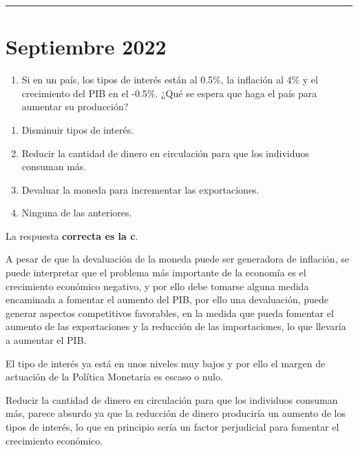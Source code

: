 \documentclass[
  letterpaper,
  DIV=11,
  numbers=noendperiod]{scrreprt}
\providecommand{\tightlist}{%
  \setlength{\itemsep}{0pt}\setlength{\parskip}{0pt}}\usepackage{longtable,booktabs,array}
\begin{document}
\begin{center}\rule{0.5\linewidth}{0.5pt}\end{center}

\hypertarget{septiembre-2022}{%
\chapter*{Septiembre 2022}\label{septiembre-2022}}


\begin{enumerate}
\def\labelenumi{\arabic{enumi}.}
\tightlist
\item
  Si en un país, los tipos de interés están al 0.5\%, la inflación al
  4\% y el crecimiento del PIB en el -0.5\%. ¿Qué se espera que haga el
  país para aumentar su producción?
\end{enumerate}

\begin{enumerate}
\def\labelenumi{\alph{enumi})}
\item
  Disminuir tipos de interés.
\item
  Reducir la cantidad de dinero en circulación para que los individuos
  consuman más.
\item
  Devaluar la moneda para incrementar las exportaciones.
\item
  Ninguna de las anteriores.
\end{enumerate}

\begin{tcolorbox}[enhanced jigsaw, left=2mm, breakable, arc=.35mm, opacityback=0, toprule=.15mm, rightrule=.15mm, leftrule=.75mm, bottomrule=.15mm, colframe=quarto-callout-tip-color-frame, colback=white]
\begin{minipage}[t]{5.5mm}
\textcolor{quarto-callout-tip-color}{\faLightbulb}
\end{minipage}%
\begin{minipage}[t]{\textwidth - 5.5mm}

La respuesta \textbf{correcta es la c}.

A pesar de que la devaluación de la moneda puede ser generadora de
inflación, se puede interpretar que el problema más importante de la
economía es el crecimiento económico negativo, y por ello debe tomarse
alguna medida encaminada a fomentar el aumento del PIB, por ello una
devaluación, puede generar aspectos competitivos favorables, en la
medida que pueda fomentar el aumento de las exportaciones y la reducción
de las importaciones, lo que llevaría a aumentar el PIB.

El tipo de interés ya está en unos niveles muy bajos y por ello el
margen de actuación de la Política Monetaria es escaso o nulo.

Reducir la cantidad de dinero en circulación para que los individuos
consuman más, parece absurdo ya que la reducción de dinero produciría un
aumento de los tipos de interés, lo que en principio sería un factor
perjudicial para fomentar el crecimiento económico.

\end{minipage}%
\end{tcolorbox}
\end{document}
